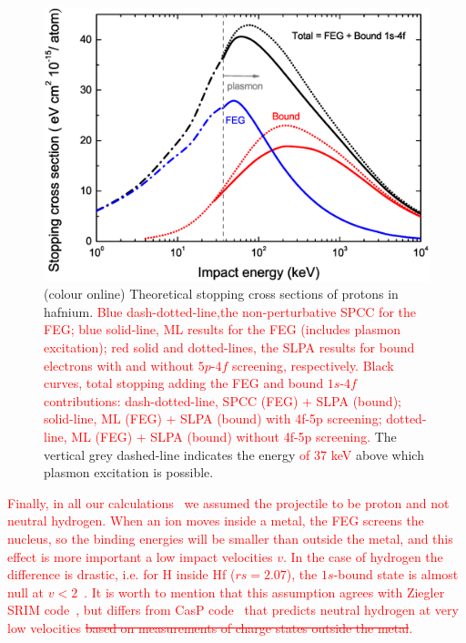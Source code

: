 \documentclass[aps,pra,reprint,superscriptaddress]{revtex4-1}
\def\clau#1{\textcolor{red}{#1}}
\begin{document}
\begin{figure}[!t]
\centering
\includegraphics[width=13.cm]{Fig02_new3.eps}
\caption{(colour online) Theoretical stopping cross sections of protons in hafnium. \clau{Blue dash-dotted-line,the non-perturbative SPCC for the FEG; blue solid-line, ML results for the FEG (includes plasmon excitation); red
solid and dotted-lines, the SLPA results for bound electrons with and without $5p$-$4f$ screening, respectively. Black curves, total  stopping
adding the FEG and bound $1s$-$4f$ contributions: dash-dotted-line, SPCC (FEG) + SLPA (bound); solid-line, ML (FEG) + SLPA (bound) with 4f-5p screening; dotted-line, ML (FEG) + SLPA (bound) without 4f-5p screening.}
The vertical grey dashed-line indicates the energy \clau{of 37 keV} above which plasmon 
excitation is possible.} 
\label{slpa4f}
\end{figure}


\clau{Finally, in all our calculations~\cite{mon17} we assumed the projectile to be proton and not neutral hydrogen. When an ion moves inside a metal, the FEG screens the nucleus, so the binding energies will be smaller than outside the metal, and this effect is more important a low impact velocities $v$. In the case of hydrogen the difference is drastic, i.e. for H inside Hf ($rs=2.07$), the $1s$-bound state is almost null at $v<2$~\cite{suppression}. It is worth to mention that this assumption agrees with Ziegler SRIM code~\cite{Ziegler01}, but differs from CasP code~\cite{Grande} that predicts neutral hydrogen at very low velocities \st{based on measurements of charge states outside the metal}.}
\end{document}
